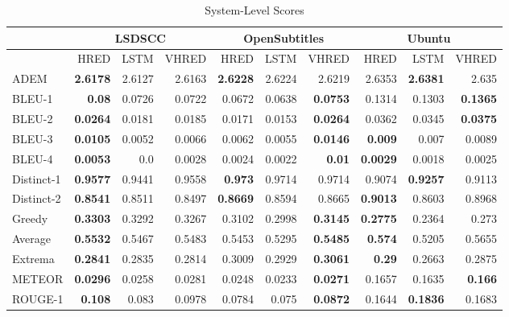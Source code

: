 \begin{table}[htb]
    \centering
    \caption{System-Level Scores}
    \small
    \label{tab:system_scores}
    \setlength{\tabcolsep}{0.11cm}
    \begin{tabular}{|l|r|r|r|r|r|r|r|r|r|}
        \hline
        & \multicolumn{3}{c|}{LSDSCC} & \multicolumn{3}{c|}{OpenSubtitles} & \multicolumn{3}{c|}{Ubuntu}\\
        \hline
        & HRED & LSTM & VHRED & HRED & LSTM & VHRED & HRED & LSTM & VHRED\\
        \hline
        ADEM & \textbf{2.6178} & 2.6127 & 2.6163 & \textbf{2.6228} & 2.6224 & 2.6219 & 2.6353 & \textbf{2.6381} & 2.635\\\hline
        BLEU{-}1 & \textbf{0.08} & 0.0726 & 0.0722 & 0.0672 & 0.0638 & \textbf{0.0753} & 0.1314 & 0.1303 & \textbf{0.1365}\\\hline
        BLEU{-}2 & \textbf{0.0264} & 0.0181 & 0.0185 & 0.0171 & 0.0153 & \textbf{0.0264} & 0.0362 & 0.0345 & \textbf{0.0375}\\\hline
        BLEU{-}3 & \textbf{0.0105} & 0.0052 & 0.0066 & 0.0062 & 0.0055 & \textbf{0.0146} & \textbf{0.009} & 0.007 & 0.0089\\\hline
        BLEU{-}4 & \textbf{0.0053} & 0.0 & 0.0028 & 0.0024 & 0.0022 & \textbf{0.01} & \textbf{0.0029} & 0.0018 & 0.0025\\\hline
        Distinct{-}1 & \textbf{0.9577} & 0.9441 & 0.9558 & \textbf{0.973} & 0.9714 & 0.9714 & 0.9074 & \textbf{0.9257} & 0.9113\\\hline
        Distinct{-}2 & \textbf{0.8541} & 0.8511 & 0.8497 & \textbf{0.8669} & 0.8594 & 0.8665 & \textbf{0.9013} & 0.8603 & 0.8968\\\hline
        Greedy & \textbf{0.3303} & 0.3292 & 0.3267 & 0.3102 & 0.2998 & \textbf{0.3145} & \textbf{0.2775} & 0.2364 & 0.273\\\hline
        Average & \textbf{0.5532} & 0.5467 & 0.5483 & 0.5453 & 0.5295 & \textbf{0.5485} & \textbf{0.574} & 0.5205 & 0.5655\\\hline
        Extrema & \textbf{0.2841} & 0.2835 & 0.2814 & 0.3009 & 0.2929 & \textbf{0.3061} & \textbf{0.29} & 0.2663 & 0.2875\\\hline
        METEOR & \textbf{0.0296} & 0.0258 & 0.0281 & 0.0248 & 0.0233 & \textbf{0.0271} & 0.1657 & 0.1635 & \textbf{0.166}\\\hline
        ROUGE{-}1 & \textbf{0.108} & 0.083 & 0.0978 & 0.0784 & 0.075 & \textbf{0.0872} & 0.1644 & \textbf{0.1836} & 0.1683\\\hline

\end{tabular}
\end{table}
